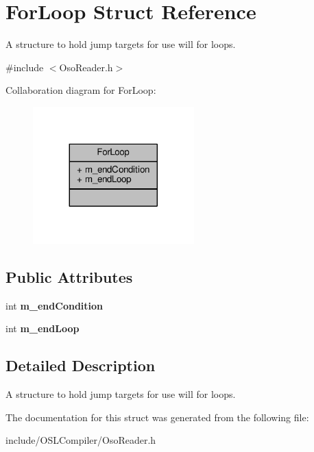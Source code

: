 \hypertarget{struct_for_loop}{\section{For\-Loop Struct Reference}
\label{struct_for_loop}
}


A structure to hold jump targets for use will for loops.  




{\ttfamily \#include $<$Oso\-Reader.\-h$>$}



Collaboration diagram for For\-Loop\-:
\nopagebreak
\begin{figure}[H]
\begin{center}
\leavevmode
\includegraphics[width=176pt]{struct_for_loop__coll__graph}
\end{center}
\end{figure}
\subsection*{Public Attributes}
\begin{DoxyCompactItemize}
\item 
\hypertarget{struct_for_loop_aaef7e31074d40bf7b19e49b93351ac58}{int {\bfseries m\-\_\-end\-Condition}}\label{struct_for_loop_aaef7e31074d40bf7b19e49b93351ac58}

\item 
\hypertarget{struct_for_loop_a3480ffbbf6537330ed26e7925f4a10e9}{int {\bfseries m\-\_\-end\-Loop}}\label{struct_for_loop_a3480ffbbf6537330ed26e7925f4a10e9}

\end{DoxyCompactItemize}


\subsection{Detailed Description}
A structure to hold jump targets for use will for loops. 

The documentation for this struct was generated from the following file\-:\begin{DoxyCompactItemize}
\item 
include/\-O\-S\-L\-Compiler/Oso\-Reader.\-h\end{DoxyCompactItemize}
